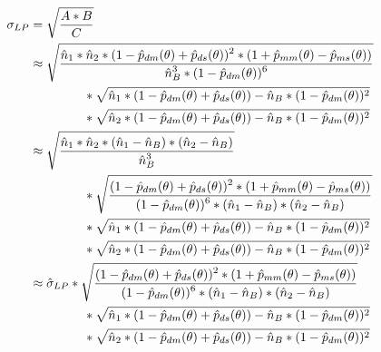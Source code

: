 \begin{align} \label{eq:large-ci}
    \begin{split}
        \sigma_{LP} &= \sqrt{\frac{\displaystyle A*B}{\displaystyle C}} \\
        &\approx \sqrt{\frac{\displaystyle \hat{n}_{1} * \hat{n}_{2} * (1 - \hat{p}_{dm}(\theta) + \hat{p}_{ds}(\theta))^2 * (1 + \hat{p}_{mm}(\theta) - \hat{p}_{ms}(\theta))}{\displaystyle \hat{n}_{B}^3 * (1 - \hat{p}_{dm}(\theta))^6}} \\
        & \hspace{1.5cm} * \sqrt{\hat{n}_{1} * (1 - \hat{p}_{dm}(\theta) + \hat{p}_{ds}(\theta)) - \hat{n}_{B} * (1 - \hat{p}_{dm}(\theta))^2} \\
        & \hspace{1.5cm} * \sqrt{\hat{n}_{2} * (1 - \hat{p}_{dm}(\theta) + \hat{p}_{ds}(\theta)) - \hat{n}_{B} * (1 - \hat{p}_{dm}(\theta))^2} \\
        &\approx \sqrt{\frac{\displaystyle \hat{n}_{1} * \hat{n}_{2} * (\hat{n}_{1} - \hat{n}_{B}) * (\hat{n}_{2} - \hat{n}_{B})}{\displaystyle \hat{n}_{B}^3}}  \\
        & \hspace{1.5cm} * \sqrt{\frac{\displaystyle (1 - \hat{p}_{dm}(\theta) + \hat{p}_{ds}(\theta))^2 * (1 + \hat{p}_{mm}(\theta) - \hat{p}_{ms}(\theta))}{\displaystyle (1 - \hat{p}_{dm}(\theta))^6 * (\hat{n}_{1} - \hat{n}_{B})*(\hat{n}_{2} - \hat{n}_{B})}} \\
        & \hspace{1.5cm} * \sqrt{\hat{n}_{1} * (1 - \hat{p}_{dm}(\theta) + \hat{p}_{ds}(\theta)) - \hat{n}_{B} * (1 - \hat{p}_{dm}(\theta))^2} \\
        & \hspace{1.5cm} * \sqrt{\hat{n}_{2} * (1 - \hat{p}_{dm}(\theta) + \hat{p}_{ds}(\theta)) - \hat{n}_{B} * (1 - \hat{p}_{dm}(\theta))^2} \\
        &\approx \hat{\sigma}_{LP} * \sqrt{\frac{\displaystyle (1 - \hat{p}_{dm}(\theta) + \hat{p}_{ds}(\theta))^2 * (1 + \hat{p}_{mm}(\theta) - \hat{p}_{ms}(\theta))}{\displaystyle (1 - \hat{p}_{dm}(\theta))^6 * (\hat{n}_{1} - \hat{n}_{B})*(\hat{n}_{2} - \hat{n}_{B})}} \\
        & \hspace{1.5cm} * \sqrt{\hat{n}_{1} * (1 - \hat{p}_{dm}(\theta) + \hat{p}_{ds}(\theta)) - \hat{n}_{B} * (1 - \hat{p}_{dm}(\theta))^2} \\
        & \hspace{1.5cm} * \sqrt{\hat{n}_{2} * (1 - \hat{p}_{dm}(\theta) + \hat{p}_{ds}(\theta)) - \hat{n}_{B} * (1 - \hat{p}_{dm}(\theta))^2}
    \end{split}
\end{align}

